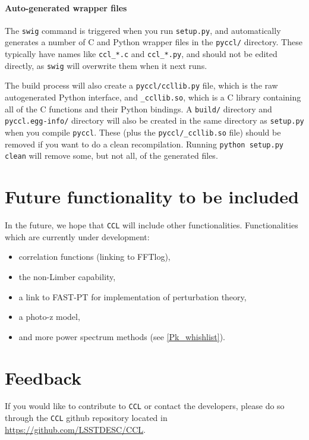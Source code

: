 \documentclass[\docopts]{\docclass}
\begin{document}
\paragraph{Auto-generated wrapper files} The {\tt swig} command is triggered when you run {\tt setup.py}, and automatically generates a number of C and Python wrapper files in the {\tt pyccl/} directory. These typically have names like {\tt ccl\_*.c} and {\tt ccl\_*.py}, and should not be edited directly, as {\tt swig} will overwrite them when it next runs.

The build process will also create a {\tt pyccl/ccllib.py} file, which is the raw autogenerated Python interface, and {\tt \_ccllib.so}, which is a C library containing all of the C functions and their Python bindings. A {\tt build/} directory and {\tt pyccl.egg-info/} directory will also be created in the same directory as {\tt setup.py} when you compile {\tt pyccl}. These (plus the {\tt pyccl/\_ccllib.so} file) should be removed if you want to do a clean recompilation. Running {\tt python setup.py clean} will remove some, but not all, of the generated files.

\section{Future functionality to be included}
\label{sec:future}

In the future, we hope that {\tt CCL} will include other functionalities. Functionalities which are currently under development:
\begin{itemize}
	\item correlation functions (linking to FFTlog),
	\item the non-Limber capability,
	\item a link to FAST-PT \citep{FASTPT} for implementation of perturbation theory,
	\item a photo-z model,
	\item and more power spectrum methods (see \ref{Pk_whishlist}).
\end{itemize}

\section{Feedback}
\label{sec:feedback}

If you would like to contribute to {\tt CCL} or contact the developers, please do so through the {\tt CCL} github repository located in \url{https://github.com/LSSTDESC/CCL}.
\end{document}

